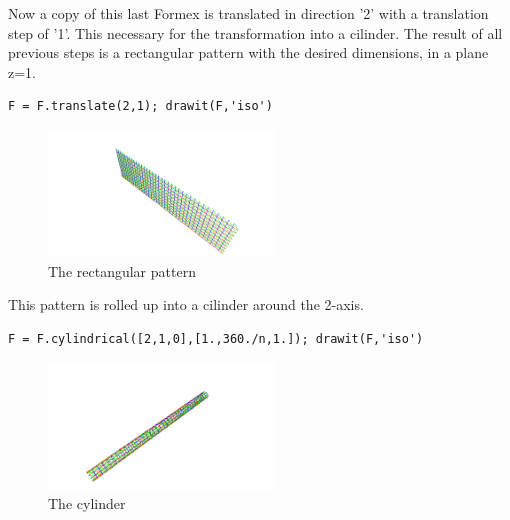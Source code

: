 Now a copy of this last Formex is translated in direction '2' with a 
translation step of '1'. This necessary for the transformation into a cilinder.
The result of all previous steps is a rectangular pattern with the desired 
dimensions, in a plane z=1.
\begin{verbatim}
F = F.translate(2,1); drawit(F,'iso')
\end{verbatim}
\begin{figure}[ht]
  \centering
  \begin{makeimage}
  \end{makeimage}
  \begin{latexonly}
    \includegraphics[width=6cm]{images/spiral-003}
  \end{latexonly}
  \begin{htmlonly}
  \end{htmlonly}  
  \caption{The rectangular pattern}
\end{figure}

This pattern is rolled up into a cilinder around the 2-axis. 
\begin{verbatim}
F = F.cylindrical([2,1,0],[1.,360./n,1.]); drawit(F,'iso')
\end{verbatim}
\begin{figure}[ht]
  \centering
  \begin{makeimage}
  \end{makeimage}
  \begin{latexonly}
    \includegraphics[width=6cm]{images/spiral-004}
  \end{latexonly}
  \begin{htmlonly}
  \end{htmlonly}  
  \caption{The cylinder}
\end{figure}

